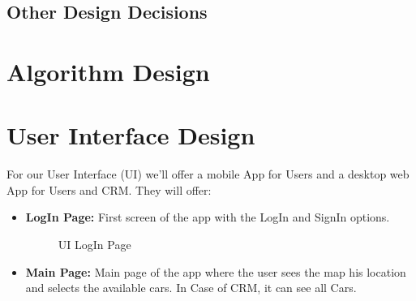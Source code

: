 \documentclass[a4paper]{article}
\begin{document}
\subsection{Other Design Decisions}

\section{Algorithm Design}

\section{User Interface Design}
For our User Interface (UI) we'll offer a mobile App for Users and a desktop web App for Users and CRM. They will offer:
\begin {itemize}
\item \textbf{LogIn Page:} First screen of the app with the LogIn and SignIn options.
\begin{figure}[h]
\centering
\vspace*{\fill}
\noindent{}%
\caption {UI LogIn Page}
\vspace*{0.2cm}
\end{figure}
\pagebreak
\item \textbf{Main Page:} Main page of the app where the user sees the map his location and selects the available cars. In Case of CRM, it can see all Cars.
\begin{figure}[h]
\centering
\vspace*{\fill}
\noindent{}%

\end{figure}
\end{itemize}
\end{document}
